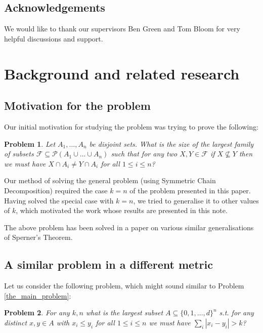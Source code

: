 \documentclass[11pt, reqno]{amsart}
\newtheorem{problem}{Problem}
\numberwithin{equation}{section}
\begin{document}
\subsection{Acknowledgements}
We would like to thank our supervisors Ben Green and Tom Bloom for very helpful discussions and support.

\section{Background and related research}

\subsection{Motivation for the problem}

Our initial motivation for studying the problem was trying to prove the following:

\begin{problem}
    Let $A_1, \dots, A_n$ be disjoint sets. What is the size of the largest family of subsets $\mathcal{F} \subseteq \mathcal{P}(A_1 \cup \dots \cup A_n)$ such that for any two $X, Y \in \mathcal{F}$ if $X \nsubseteq Y$ then we must have $X \cap A_i \neq Y \cap A_i$ for all $1 \leqslant i \leqslant n$?
\end{problem}

Our method of solving the general problem (using Symmetric Chain Decomposition) required the case $k=n$ of the problem presented in this paper. Having solved the special case with $k=n$, we tried to generalise it to other values of $k$, which motivated the work whose results are presented in this note.

The above problem has been solved in a paper \cite[Theorem 5.1]{tour_m_part_p_sperner_families} on various similar generalisations of Sperner's Theorem.

\subsection{A similar problem in a different metric}

Let us consider the following problem, which might sound similar to Problem \ref{the_main_problem}:

\begin{problem}
\label{another_problem}
    For any $k, n$ what is the largest subset $A \subseteq \{0, 1, \dots, d\}^n$ s.t. for any distinct $x, y \in A$ with $x_i \leqslant y_i$ for all $1 \leqslant i \leqslant n$ we must have $\sum_i |x_i - y_i| > k$?
\end{problem}
\end{document}
